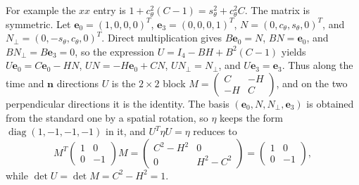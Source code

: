 For example the $xx$ entry is
$1+c_\theta^2(C-1)=s_\theta^2+c_\theta^2C$.
The matrix is symmetric. Let $\mathbf e_0=(1,0,0,0)^T$,
$\mathbf e_3=(0,0,0,1)^T$, $N=(0,c_\theta,s_\theta,0)^T$, and
$N_\perp=(0,-s_\theta,c_\theta,0)^T$. Direct multiplication gives
$B\mathbf e_0=N$, $BN=\mathbf e_0$, and $BN_\perp=B\mathbf e_3=0$, so
the expression $U=I_4-BH+B^2(C-1)$ yields
$U\mathbf e_0=C\mathbf e_0-HN$, $UN=-H\mathbf e_0+CN$,
$UN_\perp=N_\perp$, and $U\mathbf e_3=\mathbf e_3$.
Thus along the time and $\mathbf n$ directions $U$ is the
$2\times2$ block $M=\begin{pmatrix}C&-H\\-H&C\end{pmatrix}$, and on
the two perpendicular directions it is the identity.
The basis $(\mathbf e_0,N,N_\perp,\mathbf e_3)$ is obtained from the
standard one by a spatial rotation, so $\eta$ keeps the form
$\operatorname{diag}(1,-1,-1,-1)$ in it, and $U^T\eta U=\eta$
reduces to
\[
M^T\begin{pmatrix}1&0\\0&-1\end{pmatrix}M
=\begin{pmatrix}C^2-H^2&0\\0&H^2-C^2\end{pmatrix}
=\begin{pmatrix}1&0\\0&-1\end{pmatrix},
\]
while $\det U=\det M=C^2-H^2=1$.

